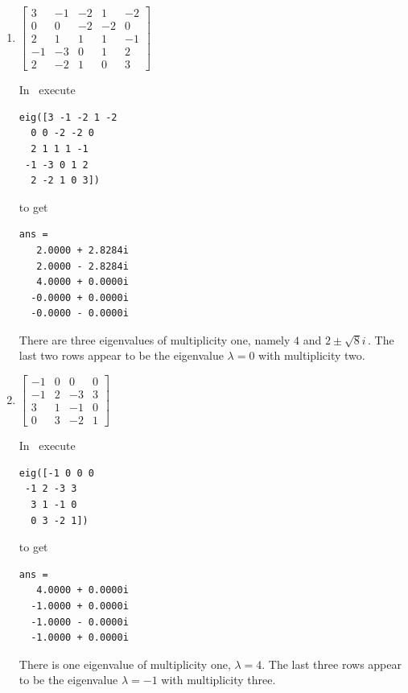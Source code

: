 \begin{example}
\begin{enumerate}
\item \(\begin{bmatrix}3&-1&-2&1&-2
\\0&0&-2&-2&0
\\2&1&1&1&-1
\\-1&-3&0&1&2
\\2&-2&1&0&3\end{bmatrix}\)
\begin{solution} 
In \script\ execute
\begin{verbatim}
eig([3 -1 -2 1 -2
  0 0 -2 -2 0
  2 1 1 1 -1
 -1 -3 0 1 2
  2 -2 1 0 3])
\end{verbatim}
\setbox\ajrqrbox\hbox{}%
\marginpar{\usebox{\ajrqrbox}}%
to get
\begin{verbatim}
ans =
   2.0000 + 2.8284i
   2.0000 - 2.8284i
   4.0000 + 0.0000i
  -0.0000 + 0.0000i
  -0.0000 - 0.0000i
\end{verbatim}
There are three eigenvalues of multiplicity one, namely \(4\) and \(2\pm\sqrt8i\)\,.  
The last two rows appear to be the eigenvalue \(\lambda=0\) with multiplicity two.
\end{solution}

\item \(\begin{bmatrix}-1&0&0&0
\\-1&2&-3&3
\\3&1&-1&0
\\0&3&-2&1\end{bmatrix}\)
\begin{solution} 
In \script\ execute
\begin{verbatim}
eig([-1 0 0 0
 -1 2 -3 3
  3 1 -1 0
  0 3 -2 1])
\end{verbatim}
\setbox\ajrqrbox\hbox{}%
\marginpar{\usebox{\ajrqrbox}}%
to get
\begin{verbatim}
ans =
   4.0000 + 0.0000i
  -1.0000 + 0.0000i
  -1.0000 - 0.0000i
  -1.0000 + 0.0000i
\end{verbatim}
There is one eigenvalue of multiplicity one, \(\lambda=4\).  
The last three rows appear to be the eigenvalue \(\lambda=-1\) with multiplicity three.
\end{solution}

\end{enumerate}
\end{example}





